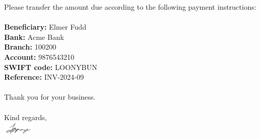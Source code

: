 \documentclass[
  11pt,
  a4paper,
  UKenglish,
  ]{article}
\begin{document}
{\small
Please transfer the amount due according to the following payment instructions:\\
\\
\textbf{Beneficiary: } Elmer Fudd\\
\textbf{Bank:} Acme Bank\\
\textbf{Branch:} 100200\\
\textbf{Account:} 9876543210\\
\textbf{SWIFT code:} LOONYBUN\\
\textbf{Reference:} INV-2024-09}\\
\\
Thank you for your business.\\
\\
Kind regards,\\
\includegraphics[height=1.8em]{resources/signature.jpg}\\


\clearpage

\hypertarget{timesheet}{}

  
\end{document}
